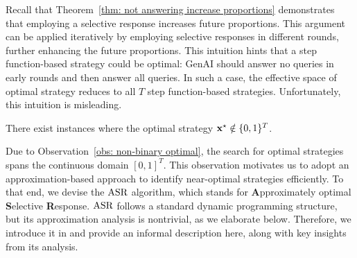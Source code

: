 Recall that Theorem~\ref{thm: not answering increase proportions} demonstrates that employing a selective response increases future proportions. This argument can be applied iteratively by employing selective responses in different rounds, further enhancing the future proportions. This intuition hints that a step function-based strategy could be optimal: GenAI should answer no queries in early rounds and then answer all queries. In such a case, the effective space of optimal strategy reduces to all $T$ step function-based strategies. Unfortunately, this intuition is misleading.
\begin{observation} \label{obs: non-binary optimal}
There exist instances where the optimal strategy ${\bf{x}}^\star \notin \{0, 1\}^T$.
\end{observation}
Due to Observation~\ref{obs: non-binary optimal}, the search for optimal strategies spans the continuous domain $[0, 1]^T$. This observation motivates us to adopt an approximation-based approach to identify near-optimal strategies efficiently. To that end, we devise the $\textnormal{ASR}$ algorithm, which stands for \textbf{A}pproximately optimal \textbf{S}elective \textbf{R}esponse. $\textnormal{ASR}$ follows a standard dynamic programming structure, but its approximation analysis is nontrivial, as we elaborate below. Therefore, we introduce it in  and provide an informal description here, along with key insights from its analysis.



